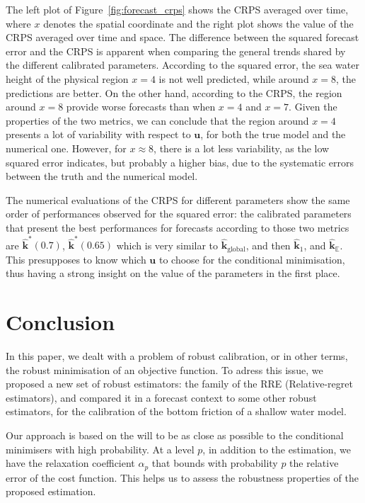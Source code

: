 \documentclass[preprint, review, 1p]{elsarticle}
\newcommand{\Ex}{\mathbb{E}}
\newcommand{\hatkmean}{\hat{\mathbf{k}}_{\Ex}}
\newcommand{\kest}{\hat{\mathbf{k}}}
\newcommand{\RRE}{RRE}
\begin{document}
The left plot of Figure~\ref{fig:forecast_crps} shows the CRPS averaged over time, where $x$ denotes the spatial coordinate and the right plot shows the value of the CRPS averaged over time and space. The difference between the squared forecast error and the CRPS is apparent when comparing the general trends shared by the different calibrated parameters. According to the squared error, the sea water height of the physical region $x=4$ is not well predicted, while around $x=8$, the predictions are better. On the other hand, according to the CRPS, the region around $x=8$ provide worse forecasts than when $x=4$ and $x=7$. Given the properties of the two metrics,  we can conclude that the region around $x=4$ presents a lot of variability with respect to $\mathbf{u}$, for both the true model and the numerical one. However, for $x \approx 8$, there is a lot less variability, as the low squared error indicates, but probably a higher bias, due to the systematic errors between the truth and the numerical model.


The numerical evaluations of the CRPS for different parameters show the same order of performances observed for the squared error: the calibrated parameters that present the best performances for forecasts according to those two metrics are $\kest^*(0.7)$, $\kest^*(0.65)$ which is very similar to $\kest_{\mathrm{global}}$, and then $\kest_1$, and $\hatkmean$.
This presupposes to know which $\mathbf{u}$ to choose for the conditional minimisation, thus having a strong insight on the value of the parameters in the first place.

\section*{Conclusion}

In this paper, we dealt with a problem of robust calibration, or in other terms, the robust minimisation of an objective function. To adress this issue, we proposed a new set of robust estimators: the family of the \RRE{} (Relative-regret estimators), and compared it in a forecast context to some other robust estimators, for the calibration of the bottom friction of a shallow water model.

Our approach is based on the will to be as close as possible to the conditional minimisers with high probability. At a level $p$, in addition to the estimation, we have the relaxation coefficient $\alpha_p$ that bounds with probability $p$ the relative error of the cost function. This helps us to assess the robustness properties of the proposed estimation.  
\end{document}
